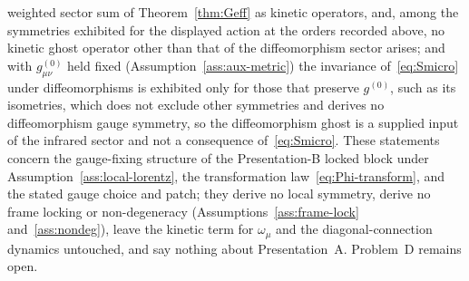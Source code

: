 weighted sector sum of Theorem~\ref{thm:Geff} as kinetic operators, and, among the symmetries exhibited
for the displayed action at the orders recorded above, no
kinetic ghost operator other than that of the diffeomorphism
sector arises; and with \(g^{(0)}_{\mu\nu}\) held fixed
(Assumption~\ref{ass:aux-metric}) the invariance
of~\eqref{eq:Smicro} under diffeomorphisms is exhibited only
for those that preserve \(g^{(0)}\), such as its isometries,
which does not exclude other symmetries and derives no
diffeomorphism gauge symmetry, so the diffeomorphism ghost is
a supplied input of the infrared sector and not a consequence
of~\eqref{eq:Smicro}.
These statements concern the gauge-fixing structure of the Presentation-B locked
block under Assumption~\ref{ass:local-lorentz}, the
transformation law~\eqref{eq:Phi-transform}, and the stated gauge choice and
patch; they derive no local symmetry, derive no frame locking or
non-degeneracy (Assumptions~\ref{ass:frame-lock} and~\ref{ass:nondeg}), leave
the kinetic term for \(\omega_\mu\) and the diagonal-connection dynamics
untouched, and say nothing about Presentation~A. Problem~D remains open.
